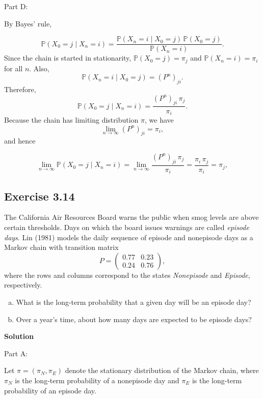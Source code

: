 \documentclass[hidelinks]{article}
\begin{document}
\noindent Part D:

\noindent By Bayes' rule,

\[
\mathbb{P}(X_0=j \mid X_n=i)
=
\frac{\mathbb{P}(X_n=i \mid X_0=j)\,\mathbb{P}(X_0=j)}{\mathbb{P}(X_n=i)}.
\]
Since the chain is started in stationarity, $\mathbb{P}(X_0=j)=\pi_j$ and
$\mathbb{P}(X_n=i)=\pi_i$ for all $n$. Also,
\[
\mathbb{P}(X_n=i \mid X_0=j)=(P^n)_{ji}.
\]
Therefore,
\[
\mathbb{P}(X_0=j \mid X_n=i)=\frac{(P^n)_{ji}\,\pi_j}{\pi_i}.
\]
Because the chain has limiting distribution $\pi$, we have
\[
\lim_{n\to\infty}(P^n)_{ji}=\pi_i,
\]
and hence

\[
\lim_{n\to\infty}\mathbb{P}(X_0=j \mid X_n=i)
=
\lim_{n\to\infty}\frac{(P^n)_{ji}\,\pi_j}{\pi_i}
=
\frac{\pi_i\,\pi_j}{\pi_i}
=
\pi_j,
\]







\subsection{Exercise 3.14}

The California Air Resources Board warns the public when smog levels are above certain thresholds. Days on which the board issues warnings are called \emph{episode days}. Lin (1981) models the daily sequence of episode and nonepisode days as a Markov chain with transition matrix
\[
P =
\begin{pmatrix}
0.77 & 0.23 \\
0.24 & 0.76
\end{pmatrix},
\]
where the rows and columns correspond to the states \emph{Nonepisode} and \emph{Episode}, respectively.

\begin{enumerate}[(a)]
\item What is the long-term probability that a given day will be an episode day?
\item Over a year's time, about how many days are expected to be episode days?
\end{enumerate}

\noindent \textbf{Solution}

\smallskip

\noindent Part A:

\noindent Let $\pi = (\pi_N, \pi_E)$ denote the stationary distribution of the Markov chain, where
$\pi_N$ is the long-term probability of a nonepisode day and $\pi_E$ is the long-term
probability of an episode day.
\end{document}
